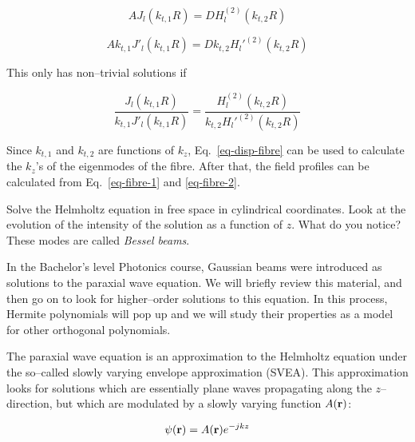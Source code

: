 \begin{equation}
A J_l\left(k_{t,1}R\right) = D H_l^{(2)}\left(k_{t,2}R\right)
\end{equation} 

\begin{equation}
A k_{t,1} J'_l\left(k_{t,1}R\right) = D k_{t,2} H_l'^{(2)}\left(k_{t,2}R\right)
\end{equation} 

This only has non--trivial solutions if

\begin{equation}
\frac{J_l\left(k_{t,1}R\right)}{k_{t,1} J'_l\left(k_{t,1}R\right)} = \frac{H_l^{(2)}\left(k_{t,2}R\right)}{k_{t,2} H_l'^{(2)}\left(k_{t,2}R\right)} \label{eq-disp-fibre}
\end{equation}

Since $k_{t,1}$ and $k_{t,2}$ are functions of $k_z$, Eq.~\ref{eq-disp-fibre} can be used to calculate the $k_z$'s of the eigenmodes of the fibre. After that, the field profiles can be calculated from Eq.~\ref{eq-fibre-1} and \ref{eq-fibre-2}.

\begin{sidebar}
\begin{ex}
Solve the Helmholtz equation in free space in cylindrical coordinates. Look at the evolution of the intensity of the solution as a function of $z$. What do you notice? These modes are called \emph{Bessel beams}.
\end{ex}
\end{sidebar}


\pagebreak



In the Bachelor's level Photonics course, Gaussian beams were introduced as solutions to the paraxial wave equation. We will briefly review this material, and then go on to look for higher--order solutions to this equation. In this process, Hermite polynomials will pop up and we will study their properties as a model for other orthogonal polynomials.

The paraxial wave equation is an approximation to the Helmholtz equation under the so--called slowly varying envelope approximation (SVEA). This approximation looks for solutions which are essentially plane waves propagating along the $z$--direction, but which are modulated by a slowly varying function $A({\bf r})$:

\begin{equation}
\psi({\bf r}) = A({\bf r})e^{-jkz}
\end{equation} 

